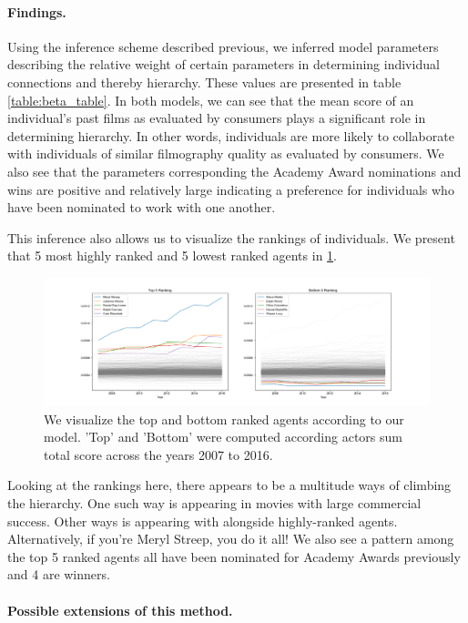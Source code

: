 \documentclass{article}
\begin{document}
\paragraph{Findings.}

Using the inference scheme described previous, we inferred model parameters describing the relative weight of certain parameters in determining individual connections and thereby hierarchy. These values are presented in table \ref{table:beta_table}. In both models, we can see that the mean score of an individual's past films as evaluated by consumers plays a significant role in determining hierarchy. In other words, individuals are more likely to collaborate with individuals of similar filmography quality as evaluated by consumers. We also see that the parameters corresponding the Academy Award nominations and wins are positive and relatively large indicating a preference for individuals who have been nominated to work with one another.

This inference also allows us to visualize the rankings of individuals. We present that 5 most highly ranked and 5 lowest ranked agents in \ref{fig:top_bottom}. 

\begin{figure}[ht]
    \centering
    \includegraphics[scale=0.4]{rankings.png}
    \caption{We visualize the top and bottom ranked agents according to our model. 'Top' and 'Bottom' were computed according actors sum total score across the years 2007 to 2016.}
    \label{fig:top_bottom}
\end{figure}

Looking at the rankings here, there appears to be a multitude ways of climbing the hierarchy. One such way is appearing in movies with large commercial success. Other ways is appearing with alongside highly-ranked agents. Alternatively, if you're Meryl Streep, you do it all!  We also see a pattern among the top 5 ranked agents all have been nominated for Academy Awards previously and 4 are winners.

\paragraph{Possible extensions of this method.}
\end{document}
